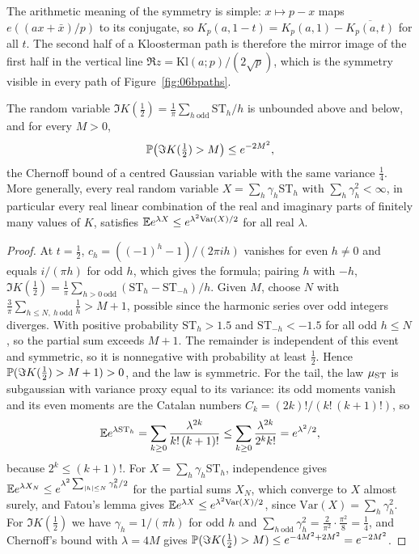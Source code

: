 The arithmetic meaning of the symmetry is simple: $x\mapsto p-x$ maps $e((ax+\bar x)/p)$ to its conjugate, so $K_p(a,1-t)=K_p(a,1)-\overline{K_p(a,t)}$ for all $t$. The second half of a Kloosterman path is therefore the mirror image of the first half in the vertical line $\Re z=\mathrm{Kl}(a;p)/(2\sqrt p)$, which is the symmetry visible in every path of Figure~\ref{fig:06bpaths}.

\begin{proposition}\label{prop:06btail}
The random variable $\Im K(\frac12)=\frac1\pi\sum_{h\ \mathrm{odd}}\mathrm{ST}_h/h$ is unbounded above and below, and for every $M>0$,
\[
\mathbb{P}\bigl(\Im K(\tfrac12)>M\bigr)\le e^{-2M^2},
\]
the Chernoff bound of a centred Gaussian variable with the same variance $\frac14$. More generally, every real random variable $X=\sum_h\gamma_h\mathrm{ST}_h$ with $\sum_h\gamma_h^2<\infty$, in particular every real linear combination of the real and imaginary parts of finitely many values of $K$, satisfies $\mathbb{E} e^{\lambda X}\le e^{\lambda^2\mathrm{Var}(X)/2}$ for all real $\lambda$.
\end{proposition}

\begin{proof}
At $t=\frac12$, $c_h=((-1)^h-1)/(2\pi ih)$ vanishes for even $h\ne0$ and equals $i/(\pi h)$ for odd $h$, which gives the formula; pairing $h$ with $-h$, $\Im K(\frac12)=\frac1\pi\sum_{h>0\ \mathrm{odd}}(\mathrm{ST}_h-\mathrm{ST}_{-h})/h$. Given $M$, choose $N$ with $\frac{3}{\pi}\sum_{h\le N,\ h\ \mathrm{odd}}\frac1h>M+1$, possible since the harmonic series over odd integers diverges. With positive probability $\mathrm{ST}_h>1.5$ and $\mathrm{ST}_{-h}<-1.5$ for all odd $h\le N$, so the partial sum exceeds $M+1$. The remainder is independent of this event and symmetric, so it is nonnegative with probability at least $\frac12$. Hence $\mathbb{P}(\Im K(\frac12)>M+1)>0$, and the law is symmetric. For the tail, the law $\mu_{\mathrm{ST}}$ is subgaussian with variance proxy equal to its variance: its odd moments vanish and its even moments are the Catalan numbers $C_k=(2k)!/(k!\,(k+1)!)$, so
\[
\mathbb{E} e^{\lambda\mathrm{ST}_h}=\sum_{k\ge0}\frac{\lambda^{2k}}{k!\,(k+1)!}\le\sum_{k\ge0}\frac{\lambda^{2k}}{2^kk!}=e^{\lambda^2/2},
\]
because $2^k\le(k+1)!$. For $X=\sum_h\gamma_h\mathrm{ST}_h$, independence gives $\mathbb{E} e^{\lambda X_N}\le e^{\lambda^2\sum_{|h|\le N}\gamma_h^2/2}$ for the partial sums $X_N$, which converge to $X$ almost surely, and Fatou's lemma gives $\mathbb{E} e^{\lambda X}\le e^{\lambda^2\mathrm{Var}(X)/2}$, since $\mathrm{Var}(X)=\sum_h\gamma_h^2$. For $\Im K(\frac12)$ we have $\gamma_h=1/(\pi h)$ for odd $h$ and $\sum_{h\ \mathrm{odd}}\gamma_h^2=\frac{2}{\pi^2}\cdot\frac{\pi^2}{8}=\frac14$, and Chernoff's bound with $\lambda=4M$ gives $\mathbb{P}(\Im K(\frac12)>M)\le e^{-4M^2+2M^2}=e^{-2M^2}$.
\end{proof}

